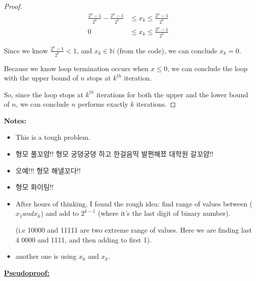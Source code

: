 \documentclass[12pt]{article}
\begin{document}
\begin{enumerate}[a.]
\begin{proof}
        \begin{align}
            \frac{2^k - 1}{2^k} - \frac{2^k - 1}{2^k} &\leq x_k \leq \frac{2^k - 1}{2^k}\\
            0 &\leq x_k \leq \frac{2^k - 1}{2^k}
        \end{align}

        \bigskip

        Since we know $\frac{2^k - 1}{2^k} < 1$, and $x_k \in \mathbb{N}$ (from the code),
        we can conclude $x_k = 0$.

        \bigskip

        Because we know loop termination occurs when $x \leq 0$, we can conclude
        the loop with the upper bound of $n$ stops at $k^{th}$ iteration.

        \bigskip

        So, since the loop stops at $k^{th}$ iterations for both the upper
        and the lower bound of $n$, we can conclude $n$ performs exactly
        $k$ iterations.
    \end{proof}

    \bigskip

    \textbf{Notes:}

    \begin{itemize}
        \item This is a tough problem.
        \item 형모 풀꼬얌!! 형모 궁뎡궁뎡 하고 한걸음띡 발쩐해쬬 대학원 갈꼬얌!!
        \item 오예!!! 형모 해낼꼬다!!
        \item 형모 화이팅!!
        \item After hours of thinking, I found the rough idea: find range of values
        between ($x_1 and x_k$) and add to $2^{k-1}$ (where it's the last digit
        of binary number).

        (i.e 10000 and 11111 are two extreme range of values. Here we are finding
        last 4 0000 and 1111, and then adding to first 1).

        \item another one is using $x_0$ and $x_k$.
    \end{itemize}

    \bigskip

    \begin{mdframed}

        \underline{\textbf{Pseudoproof:}}

        \bigskip


\end{mdframed}
\end{enumerate}
\end{document}
